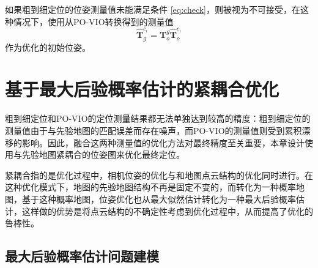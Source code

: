 如果粗到细定位的位姿测量值未能满足条件 \eqref{eq:check}，则被视为不可接受，在这种情况下，使用从PO-VIO转换得到的测量值
\begin{equation}
    \hat{\symbf{T}}_{g}^{c_i} = \symbf{T}_{o}^g \hat{\symbf{T}}_{o}^{c_i}
\end{equation}
作为优化的初始位姿。

\section{基于最大后验概率估计的紧耦合优化}
\label{sec:tight_opt}

粗到细定位和PO-VIO的定位测量结果都无法单独达到较高的精度：粗到细定位的测量值由于与先验地图的匹配误差而存在噪声，而PO-VIO的测量值则受到累积漂移的影响。因此，融合这两种测量值的优化方法对最终精度至关重要，本章设计使用与先验地图紧耦合的位姿图来优化最终定位。

紧耦合指的是优化过程中，相机位姿的优化与和地图点云结构的优化同时进行。在这种优化模式下，地图的先验地图结构不再是固定不变的，而转化为一种概率地图，基于这种概率地图，位姿优化也从最大似然估计转化为一种最大后验概率估计，这样做的优势是将点云结构的不确定性考虑到优化过程中，从而提高了优化的鲁棒性。

\subsection{最大后验概率估计问题建模}

